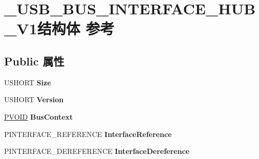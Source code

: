 \hypertarget{struct___u_s_b___b_u_s___i_n_t_e_r_f_a_c_e___h_u_b___v1}{}\section{\+\_\+\+U\+S\+B\+\_\+\+B\+U\+S\+\_\+\+I\+N\+T\+E\+R\+F\+A\+C\+E\+\_\+\+H\+U\+B\+\_\+\+V1结构体 参考}
\label{struct___u_s_b___b_u_s___i_n_t_e_r_f_a_c_e___h_u_b___v1}
\subsection*{Public 属性}
\begin{DoxyCompactItemize}
\item 
\mbox{\label{struct___u_s_b___b_u_s___i_n_t_e_r_f_a_c_e___h_u_b___v1_ade40a508cc948ef3884db0cdc38e9bb6}} 
U\+S\+H\+O\+RT {\bfseries Size}
\item 
\mbox{\label{struct___u_s_b___b_u_s___i_n_t_e_r_f_a_c_e___h_u_b___v1_a602d93d061ecd898d56f47419e269828}} 
U\+S\+H\+O\+RT {\bfseries Version}
\item 
\mbox{\label{struct___u_s_b___b_u_s___i_n_t_e_r_f_a_c_e___h_u_b___v1_a2ba99a1ee8035da0c3c6d35f2ba7e45c}} 
\hyperlink{interfacevoid}{P\+V\+O\+ID} {\bfseries Bus\+Context}
\item 
\mbox{\label{struct___u_s_b___b_u_s___i_n_t_e_r_f_a_c_e___h_u_b___v1_acd30708c58596931a5d2f454e60281e5}} 
P\+I\+N\+T\+E\+R\+F\+A\+C\+E\+\_\+\+R\+E\+F\+E\+R\+E\+N\+CE {\bfseries Interface\+Reference}
\item 
\mbox{\label{struct___u_s_b___b_u_s___i_n_t_e_r_f_a_c_e___h_u_b___v1_adee9b48b61079d6fef934d1b2663cc77}} 
P\+I\+N\+T\+E\+R\+F\+A\+C\+E\+\_\+\+D\+E\+R\+E\+F\+E\+R\+E\+N\+CE {\bfseries Interface\+Dereference}
\item 
\mbox{\label{struct___u_s_b___b_u_s___i_n_t_e_r_f_a_c_e___h_u_b___v1_a90c63c5b029fb8d4546cb115b2d952b5}} 

\end{DoxyCompactItemize}
